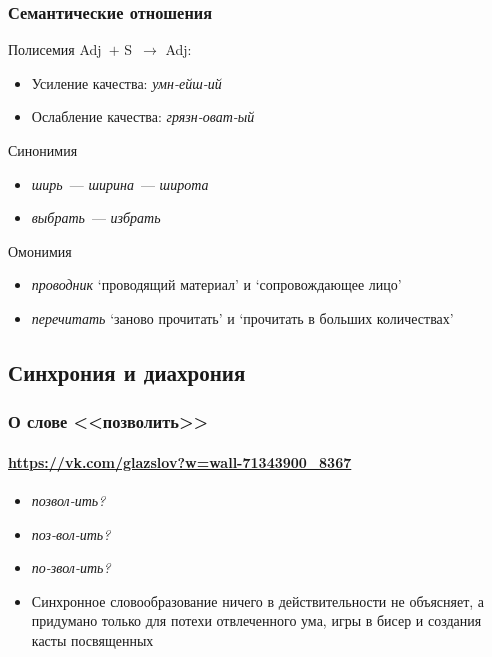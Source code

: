 \begin{frame}
    \frametitle{Семантические отношения}

    \begin{block}{Полисемия}
        Adj~$+$ S~$\rightarrow$ Adj: \begin{itemize}
            \item Усиление качества: \textit{умн-ейш-ий}
            \item Ослабление качества: \textit{грязн-оват-ый}
        \end{itemize}
    \end{block}

    \begin{exampleblock}{Синонимия}
        \begin{itemize}
            \item \textit{ширь}~--- \textit{ширина}~--- \textit{широта}
            \item \textit{выбрать}~--- \textit{избрать}
        \end{itemize}
    \end{exampleblock}

    \begin{alertblock}{Омонимия}
        \begin{itemize}
            \item \textit{проводник} `проводящий материал' и `сопровождающее лицо'
            \item \textit{перечитать} `заново прочитать' и `прочитать в больших количествах'
        \end{itemize}
    \end{alertblock}
\end{frame}

\subsection{Синхрония и диахрония}


\begin{frame}
    \frametitle{О слове <<позволить>>}
    \framesubtitle{\url{https://vk.com/glazslov?w=wall-71343900_8367}}

    \begin{itemize}
        \item \textit{позвол-ить?}
        \item \textit{поз-вол-ить?}
        \item \textit{по-звол-ить?}
        \item<5-> Синхронное словообразование ничего в действительности не объясняет, а придумано только для потехи отвлеченного ума, игры в бисер и создания касты посвященных
    \end{itemize}
\end{frame}
